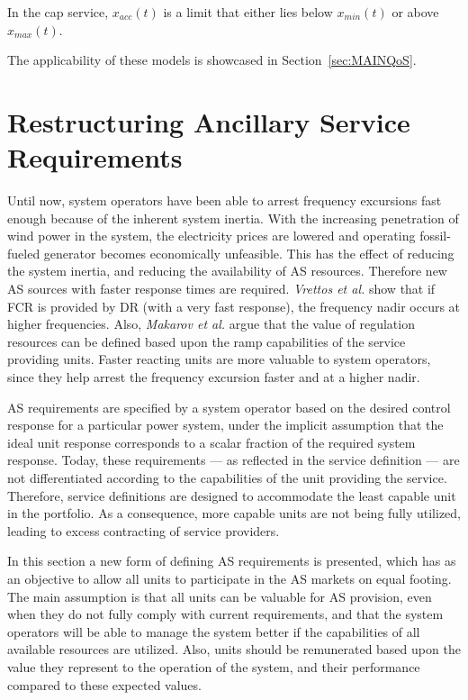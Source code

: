 In the cap service, $x_{acc}(t)$ is a limit that either lies below $x_{min}(t)$ or above $x_{max}(t)$.

The applicability of these models is showcased in Section~\ref{sec:MAINQoS}.

%
\section{Restructuring Ancillary Service Requirements} %
\label{sec:RedefiningAncillaryServiceRequirements}
Until now, system operators have been able to arrest frequency excursions fast enough because of the inherent system inertia. With the increasing penetration of wind power in the system, the electricity prices are lowered and operating fossil-fueled generator becomes economically unfeasible. This has the effect of reducing the system inertia, and reducing the availability of AS resources. Therefore new AS sources with faster response times are required. \emph{Vrettos et al.} show that if FCR is provided by DR (with a very fast response), the frequency nadir occurs at higher frequencies.
Also, \emph{Makarov et al.} argue that the value of regulation resources can be defined based upon the ramp capabilities of the service providing units. Faster reacting units are more valuable to system operators, since they help arrest the frequency excursion faster and at a higher nadir.%


AS requirements are specified by a system operator based on the desired control response for a particular power system, under the implicit assumption that the ideal unit response corresponds to a scalar fraction of the required system response. Today, these requirements --- as reflected in the service definition --- are not differentiated according to the capabilities of the unit providing the service. Therefore, service definitions are designed to accommodate the least capable unit in the portfolio. As a consequence, more capable units are not being fully utilized, leading to excess contracting of service providers.

 In this section a new form of defining AS requirements is presented, which has as an objective to allow all units to participate in the AS markets on equal footing. The main assumption is that all units can be valuable for AS provision, even when they do not fully comply with current requirements, and that the system operators will be able to manage the system better if the capabilities of all available resources are utilized. Also, units should be remunerated based upon the value they represent to the operation of the system, and their performance compared to these expected values.

